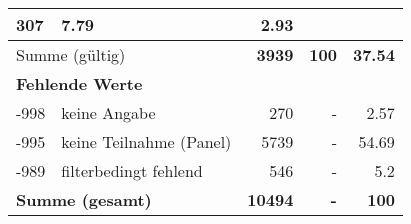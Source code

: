 \begin{longtable}{lXrrr}
       \num{307} &
       \num[round-mode=places,round-precision=2]{7.79} &
         \num[round-mode=places,round-precision=2]{2.93} \\
     \midrule
     \multicolumn{2}{l}{Summe (gültig)} &
       \textbf{\num{3939}} &
     \textbf{\num{100}} &
       \textbf{\num[round-mode=places,round-precision=2]{37.54}} \\
     \multicolumn{5}{l}{\textbf{Fehlende Werte}}\\
       -998 &
       keine Angabe &
         \num{270} &
        - &
         \num[round-mode=places,round-precision=2]{2.57} \\
       -995 &
       keine Teilnahme (Panel) &
         \num{5739} &
        - &
         \num[round-mode=places,round-precision=2]{54.69} \\
       -989 &
       filterbedingt fehlend &
         \num{546} &
        - &
         \num[round-mode=places,round-precision=2]{5.2} \\
     \midrule
     \multicolumn{2}{l}{\textbf{Summe (gesamt)}} &
          \textbf{\num{10494}} &
        \textbf{-} &
        \textbf{\num{100}} \\
     \bottomrule
     \end{longtable}
     
